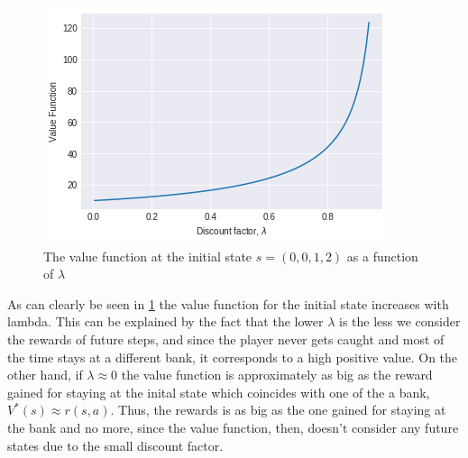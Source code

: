 \documentclass{article}
\begin{document}
\begin{figure}[h!]
    \centering
    \includegraphics[width=0.6\linewidth]{img/value_function_different_lambda.png}
    \caption{The value function at the initial state $s=(0,0,1,2)$ as a function of $\lambda$}
    \label{fig:q2-vfdiff}
\end{figure}

 As can clearly be seen in \ref{fig:q2-vfdiff} the value function for the initial state increases with lambda. This can be explained by the fact that the lower $\lambda$ is the less we consider the rewards of future steps, and since the player never gets caught and most of the time stays at a different bank, it corresponds to a high positive value. On the other hand, if $\lambda \approx 0$ the value function is approximately as big as the reward gained for staying at the inital state which coincides with one of the a bank,  $V^*(s) \approx r(s,a)$. Thus, the rewards is as big as the one gained for staying at the bank and no more, since the value function, then, doesn't consider any future states due to the small discount factor.
\end{document}
